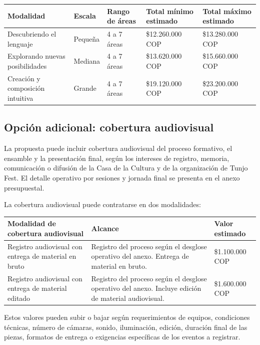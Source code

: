 \documentclass[11pt,a4paper]{article}
\newcommand{\SectionTone}{SectionBlue}
\newcommand{\tableheadcolor}{\rowcolor{\SectionTone!22}}
\newcommand{\cop}{COP}
\begin{document}
{\small
\begin{tabularx}{\textwidth}{@{}L{0.24\textwidth}L{0.14\textwidth}L{0.15\textwidth}R{0.18\textwidth}R{0.18\textwidth}@{}}
\toprule
\tableheadcolor
\textbf{Modalidad} & \textbf{Escala} & \textbf{Rango de áreas} & \textbf{Total mínimo estimado} & \textbf{Total máximo estimado} \\
\midrule
Descubriendo el lenguaje & Pequeña & 4 a 7 áreas & \$12.260.000 \cop & \$13.280.000 \cop \\
Explorando nuevas posibilidades & Mediana & 4 a 7 áreas & \$13.620.000 \cop & \$15.660.000 \cop \\
Creación y composición intuitiva & Grande & 4 a 7 áreas & \$19.120.000 \cop & \$23.200.000 \cop \\
\bottomrule
\end{tabularx}
}

\subsection{Opción adicional: cobertura audiovisual}

La propuesta puede incluir cobertura audiovisual del proceso formativo, el ensamble y la presentación final, según los intereses de registro, memoria, comunicación o difusión de la Casa de la Cultura y de la organización de Tunjo Fest. El detalle operativo por sesiones y jornada final se presenta en el anexo presupuestal.

La cobertura audiovisual puede contratarse en dos modalidades:

{\small
\begin{tabularx}{\textwidth}{@{}L{0.28\textwidth}Y R{0.22\textwidth}@{}}
\toprule
\tableheadcolor
\textbf{Modalidad de cobertura audiovisual} & \textbf{Alcance} & \textbf{Valor estimado} \\
\midrule
Registro audiovisual con entrega de material en bruto & Registro del proceso según el desglose operativo del anexo. Entrega de material en bruto. & \$1.100.000 \cop \\
Registro audiovisual con entrega de material editado & Registro del proceso según el desglose operativo del anexo. Incluye edición de material audiovisual. & \$1.600.000 \cop \\
\bottomrule
\end{tabularx}
}

Estos valores pueden subir o bajar según requerimientos de equipos, condiciones técnicas, número de cámaras, sonido, iluminación, edición, duración final de las piezas, formatos de entrega o exigencias específicas de los eventos a registrar.
\end{document}
